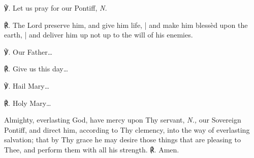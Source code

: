 \begin{otherlanguage}{english}


\noindent ℣. Let us pray for our Pontiff, \textit{N.}

\noindent ℟. The Lord preserve him, and give him life, | and make him blessèd upon the earth, | and deliver him up not up to the will of his enemies.

\noindent ℣. Our Father…

\noindent ℟. Give us this day…

\noindent ℣. Hail Mary…

\noindent ℟. Holy Mary…

\noindent 


Almighty, everlasting God, have mercy upon Thy servant, \textit{N.,}  our Sovereign Pontiff, and direct him, according to Thy clemency, into the way of everlasting salvation; that by Thy grace he may desire those things that are pleasing to Thee, and perform them with all his strength. ℟. Amen.



\end{otherlanguage}